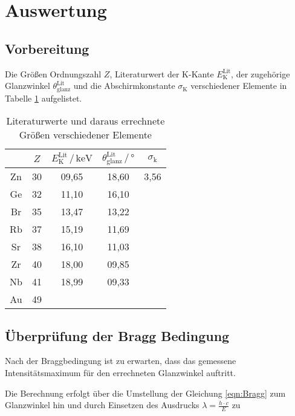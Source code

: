 \section{Auswertung}
\label{sec:Auswertung}

\subsection{Vorbereitung}

Die Größen Ordnungszahl $Z$, Literaturwert der
K-Kante $E_\text{K}^\text{Lit}$, der zugehörige Glanzwinkel 
$\theta_\text{glanz}^\text{Lit}$ und die Abschirmkonstante 
$\sigma_\text{K}$ verschiedener Elemente in Tabelle 
\ref{tab:literatur} aufgelistet.

\begin{table}
  \centering
  \caption{Literaturwerte und daraus errechnete Größen verschiedener Elemente}
  \label{tab:literatur}
  \begin{tabular}{c c c c c}
  \toprule
  $ $ & $Z$ & $E_\text{K}^\text{Lit} \,/\, \si{\kilo\eV}$
  & $\theta_\text{glanz}^\text{Lit} \,/\, \si{\degree}$ & 
  $\sigma_\text{k}$\\
  \midrule 
  Zn & 30 & 09,65 & 18,60 & 3,56 \\
  Ge & 32 & 11,10 & 16,10 &  \\
  Br & 35 & 13,47 & 13,22 &  \\
  Rb & 37 & 15,19 & 11,69 &  \\
  Sr & 38 & 16,10 & 11,03 &  \\
  Zr & 40 & 18,00 & 09,85 &  \\
  Nb & 41 & 18,99 & 09,33 &  \\
  Au & 49 &  &  &  \\
  \bottomrule
  \end{tabular}
  \end{table}




\subsection{Überprüfung der Bragg Bedingung}

Nach der Braggbedingung ist zu erwarten, dass das gemessene Intensitätsmaximum
für den errechneten Glanzwinkel auftritt. 

Die Berechnung erfolgt über die Umstellung der Gleichung \eqref{eqn:Bragg} zum Glanzwinkel
hin und durch Einsetzen des Ausdrucks $\lambda = \frac{h \cdot c}{E}$ zu 

